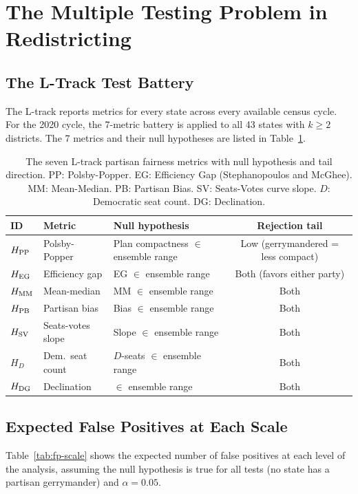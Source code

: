 \section{The Multiple Testing Problem in Redistricting}
\label{sec:testing}

\subsection{The L-Track Test Battery}

The L-track reports metrics for every state across every available
census cycle.
For the 2020 cycle, the 7-metric battery is applied to all 43 states
with $k \geq 2$ districts.
The 7 metrics and their null hypotheses are listed in Table~\ref{tab:metrics}.

\begin{table}[h]
\centering
\caption{The seven L-track partisan fairness metrics with null hypothesis
         and tail direction. PP: Polsby-Popper. EG: Efficiency Gap (Stephanopoulos and McGhee).
         MM: Mean-Median. PB: Partisan Bias. SV: Seats-Votes curve slope.
         $D$: Democratic seat count. DG: Declination.}
\label{tab:metrics}
\begin{tabular}{lllc}
\toprule
ID & Metric & Null hypothesis & Rejection tail \\
\midrule
$H_{\mathrm{PP}}$ & Polsby-Popper & Plan compactness $\in$ ensemble range & Low (gerrymandered = less compact) \\
$H_{\rm EG}$ & Efficiency gap & EG $\in$ ensemble range & Both (favors either party) \\
$H_{\rm MM}$ & Mean-median & MM $\in$ ensemble range & Both \\
$H_{\rm PB}$ & Partisan bias & Bias $\in$ ensemble range & Both \\
$H_{\rm SV}$ & Seats-votes slope & Slope $\in$ ensemble range & Both \\
$H_D$ & Dem.\ seat count & $D$-seats $\in$ ensemble range & Both \\
$H_{\rm DG}$ & Declination & $\in$ ensemble range & Both \\
\bottomrule
\end{tabular}
\end{table}

\subsection{Expected False Positives at Each Scale}

Table~\ref{tab:fp-scale} shows the expected number of false positives
at each level of the analysis, assuming the null hypothesis is true
for all tests (no state has a partisan gerrymander) and $\alpha = 0.05$.

